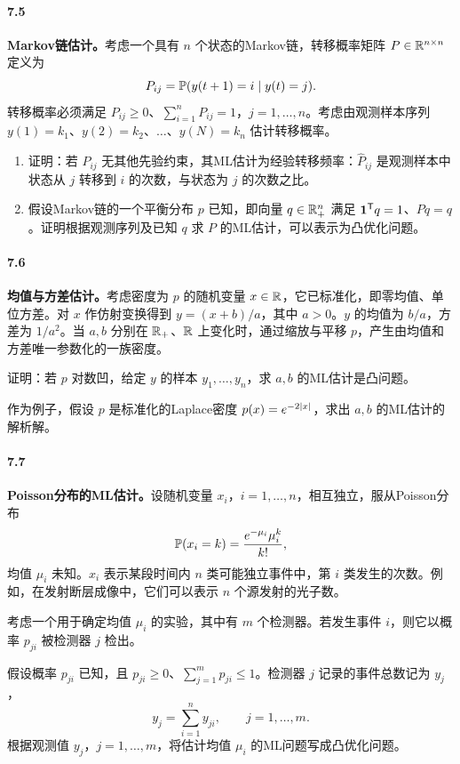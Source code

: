 \paragraph{7.5}
\textbf{Markov链估计。}考虑一个具有 $n$ 个状态的Markov链，转移概率矩阵 $P\in\mathbb R^{n\times n}$ 定义为
\[
 P_{ij}=\mathbb P(y(t+1)=i\mid y(t)=j).
\]
转移概率必须满足 $P_{ij}\ge0$、$\sum_{i=1}^nP_{ij}=1$，$j=1,\ldots,n$。考虑由观测样本序列 $y(1)=k_1$、$y(2)=k_2$、$\ldots$、$y(N)=k_n$ 估计转移概率。
\begin{enumerate}[label=(\alph*)]
\item 证明：若 $P_{ij}$ 无其他先验约束，其ML估计为经验转移频率：$\widehat P_{ij}$ 是观测样本中状态从 $j$ 转移到 $i$ 的次数，与状态为 $j$ 的次数之比。
\item 假设Markov链的一个平衡分布 $p$ 已知，即向量 $q\in\mathbb R_+^n$ 满足 $\mathbf 1^{\mathsf T}q=1$、$Pq=q$。证明根据观测序列及已知 $q$ 求 $P$ 的ML估计，可以表示为凸优化问题。
\end{enumerate}

\paragraph{7.6}
\textbf{均值与方差估计。}考虑密度为 $p$ 的随机变量 $x\in\mathbb R$，它已标准化，即零均值、单位方差。对 $x$ 作仿射变换得到 $y=(x+b)/a$，其中 $a>0$。$y$ 的均值为 $b/a$，方差为 $1/a^2$。当 $a,b$ 分别在 $\mathbb R_+$、$\mathbb R$ 上变化时，通过缩放与平移 $p$，产生由均值和方差唯一参数化的一族密度。

证明：若 $p$ 对数凹，给定 $y$ 的样本 $y_1,\ldots,y_n$，求 $a,b$ 的ML估计是凸问题。

作为例子，假设 $p$ 是标准化的Laplace密度 $p(x)=e^{-2\left\lvert x\right\rvert}$，求出 $a,b$ 的ML估计的解析解。

\paragraph{7.7}
\textbf{Poisson分布的ML估计。}设随机变量 $x_i$，$i=1,\ldots,n$，相互独立，服从Poisson分布
\[
 \mathbb P(x_i=k)=\frac{e^{-\mu_i}\mu_i^k}{k!},
\]
均值 $\mu_i$ 未知。$x_i$ 表示某段时间内 $n$ 类可能独立事件中，第 $i$ 类发生的次数。例如，在发射断层成像中，它们可以表示 $n$ 个源发射的光子数。

考虑一个用于确定均值 $\mu_i$ 的实验，其中有 $m$ 个检测器。若发生事件 $i$，则它以概率 $p_{ji}$ 被检测器 $j$ 检出。

假设概率 $p_{ji}$ 已知，且 $p_{ji}\ge0$、$\sum_{j=1}^mp_{ji}\le1$。检测器 $j$ 记录的事件总数记为 $y_j$，
\[
 y_j=\sum_{i=1}^ny_{ji},\qquad j=1,\ldots,m.
\]
根据观测值 $y_j$，$j=1,\ldots,m$，将估计均值 $\mu_i$ 的ML问题写成凸优化问题。

